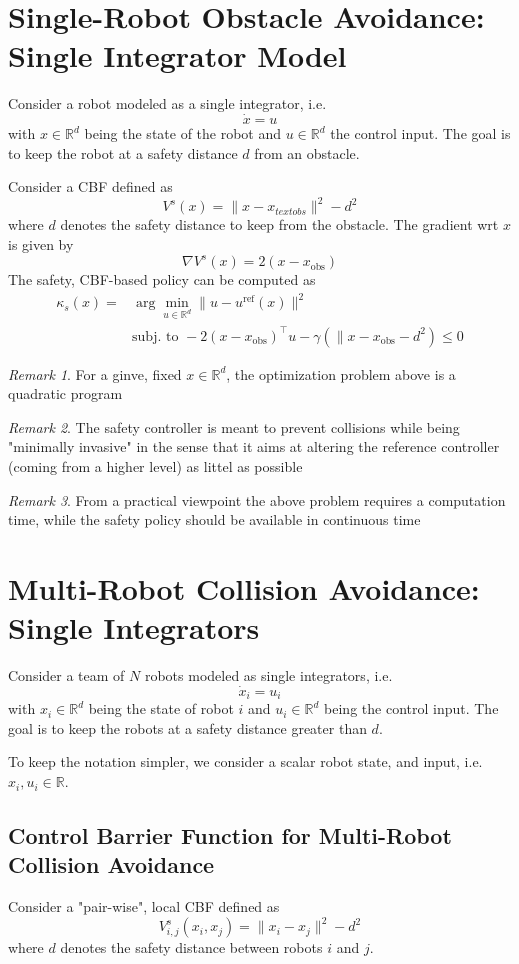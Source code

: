 \documentclass{book}
\newcommand{\R}{\mathbb{R}}
\theoremstyle{theoremv2}
\theoremstyle{defv2}
\theoremstyle{remark}
\newtheorem*{remark}{Remark}
\theoremstyle{remark}
\theoremstyle{definition}
\theoremstyle{definition}
\begin{document}
\section{Single-Robot Obstacle Avoidance: Single Integrator Model}
Consider a robot modeled as a single integrator, i.e. 
\[
    \dot{x} = u
\]
with $x\in\R^d$ being the state of the robot and $u\in\R^d$ the control input. The goal is to keep the robot at a safety distance $d$ from an obstacle.

Consider a CBF defined as 
\[
    V^s(x) = \| x - x_{text{obs}}\|^2 - d^2
\]
where $d$ denotes the safety distance to keep from the obstacle. The gradient wrt $x$ is given by 
\[
    \nabla V^s(x)  = 2(x-x_\text{obs})
\]
The safety, CBF-based policy can be computed as 
\begin{align*}
    \kappa_s (x) = &\arg \min_{u\in\R^d} \|u-u^\text{ref}(x)\|^2\\
    & \text{subj. to } -2(x-x_\text{obs})^\top u - \gamma(\|x-x_\text{obs}-d^2) \leq 0
\end{align*}
\begin{remark}
For a ginve, fixed $x\in\R^d$, the optimization problem above is a quadratic program    
\end{remark}
\begin{remark}
    The safety controller is meant to prevent collisions while being "minimally invasive" in the sense that it aims at altering the reference controller (coming from a higher level) as littel as possible
\end{remark}
\begin{remark}
    From a practical viewpoint the above problem requires a computation time, while the safety policy should be available in continuous time
\end{remark}


\section{Multi-Robot Collision Avoidance: Single Integrators}
Consider a team of $N$ robots modeled as single integrators, i.e.
\[
    \dot{x}_i = u_i
\]
with $x_i\in\R^d$ being the state of robot $i$ and $u_i\in\R^d$ being the control input. The goal is to keep the robots at a safety distance greater than $d$.

To keep the notation simpler, we consider a scalar robot state, and input, i.e. $x_i,u_i\in\R$.


\subsection{Control Barrier Function for Multi-Robot Collision Avoidance}
Consider a "pair-wise", local CBF defined as 
\[
    V_{i,j}^s (x_i,x_j) = \|x_i-x_j\|^2 - d^2
\]
where $d$ denotes the safety distance between robots $i$ and $j$. 
\end{document}
